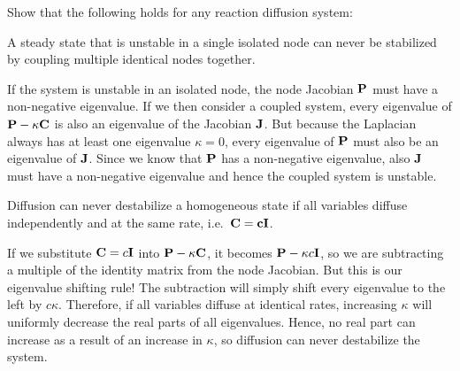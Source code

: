Show that the following holds for any reaction diffusion system:

\subquestion
A steady state that is unstable in a single isolated node can never be stabilized by coupling multiple identical nodes together. 

\solution 
If the system is unstable in an isolated node, the node Jacobian $\bf P$ must have a non-negative eigenvalue. If we then consider a coupled system, every eigenvalue of ${\bf P}-\kappa {\bf C}$ is also an eigenvalue of the Jacobian $\bf J$. But because the Laplacian always has at least one eigenvalue $\kappa = 0$, every eigenvalue of $\bf P$ must also be an eigenvalue of $\bf J$. Since we know that $\bf P$ has a non-negative eigenvalue, also $\bf J$ must have a non-negative eigenvalue and hence the coupled system is unstable. 

\subquestion 
Diffusion can never destabilize a homogeneous state if all variables diffuse independently and at the same rate, i.e.~$\bf C= c {\bf I}$. 

\solution 
If we substitute ${\bf C}=c{\bf I}$ into ${\bf P}-\kappa {\bf C}$, it becomes ${\bf P}-\kappa c {\bf I}$, so we are subtracting a multiple of the identity matrix from the node Jacobian. But this is our eigenvalue shifting rule! The subtraction will simply shift every eigenvalue to the left by $c\kappa$. Therefore, if all variables diffuse at identical rates, increasing $\kappa$ will uniformly decrease the real parts of all eigenvalues. Hence, no real part can increase as a result of an increase in $\kappa$, so diffusion can never destabilize the system.  
